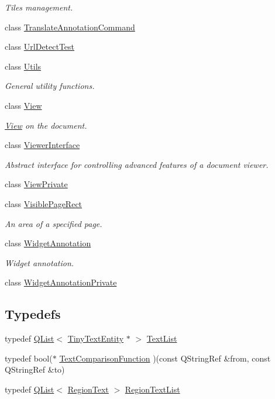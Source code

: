 \begin{DoxyCompactItemize}
\begin{DoxyCompactList}\small\item\em Tiles management. \end{DoxyCompactList}\item 
class \hyperlink{classOkular_1_1TranslateAnnotationCommand}{Translate\+Annotation\+Command}
\item 
class \hyperlink{classOkular_1_1UrlDetectTest}{Url\+Detect\+Test}
\item 
class \hyperlink{classOkular_1_1Utils}{Utils}
\begin{DoxyCompactList}\small\item\em General utility functions. \end{DoxyCompactList}\item 
class \hyperlink{classOkular_1_1View}{View}
\begin{DoxyCompactList}\small\item\em \hyperlink{classOkular_1_1View}{View} on the document. \end{DoxyCompactList}\item 
class \hyperlink{classOkular_1_1ViewerInterface}{Viewer\+Interface}
\begin{DoxyCompactList}\small\item\em Abstract interface for controlling advanced features of a document viewer. \end{DoxyCompactList}\item 
class \hyperlink{classOkular_1_1ViewPrivate}{View\+Private}
\item 
class \hyperlink{classOkular_1_1VisiblePageRect}{Visible\+Page\+Rect}
\begin{DoxyCompactList}\small\item\em An area of a specified page. \end{DoxyCompactList}\item 
class \hyperlink{classOkular_1_1WidgetAnnotation}{Widget\+Annotation}
\begin{DoxyCompactList}\small\item\em Widget annotation. \end{DoxyCompactList}\item 
class \hyperlink{classOkular_1_1WidgetAnnotationPrivate}{Widget\+Annotation\+Private}
\end{DoxyCompactItemize}
\subsection*{Typedefs}
\begin{DoxyCompactItemize}
\item 
typedef \hyperlink{classQList}{Q\+List}$<$ \hyperlink{classTinyTextEntity}{Tiny\+Text\+Entity} $\ast$ $>$ \hyperlink{namespaceOkular_ae9075ed4d543c119d2e86fae7fc6cf46}{Text\+List}
\item 
typedef bool($\ast$ \hyperlink{namespaceOkular_a686d56fd67c1b405491328f3f187a4b0}{Text\+Comparison\+Function} )(const Q\+String\+Ref \&from, const Q\+String\+Ref \&to)
\item 
typedef \hyperlink{classQList}{Q\+List}$<$ \hyperlink{classRegionText}{Region\+Text} $>$ \hyperlink{namespaceOkular_a870e45698d8c99f4400310d019c77861}{Region\+Text\+List}
\end{DoxyCompactItemize}
